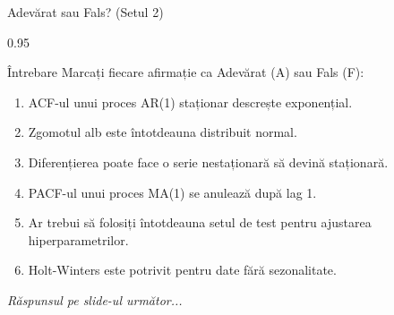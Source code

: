 \documentclass[9pt, aspectratio=169, t]{beamer}
\begin{document}
\begin{frame}{Adevărat sau Fals? (Setul 2)}
    \begin{cminipage}{0.95\textwidth}
    \begin{alertblock}{Întrebare}
        Marcați fiecare afirmație ca Adevărat (A) sau Fals (F):
    \end{alertblock}

    \vspace{0.3cm}

    \begin{enumerate}\setlength{\itemsep}{0pt}
        \item ACF-ul unui proces AR(1) staționar descrește exponențial. \hfill \underline{\hspace{1cm}}

        \vspace{0.2cm}

        \item Zgomotul alb este întotdeauna distribuit normal. \hfill \underline{\hspace{1cm}}

        \vspace{0.2cm}

        \item Diferențierea poate face o serie nestaționară să devină staționară. \hfill \underline{\hspace{1cm}}

        \vspace{0.2cm}

        \item PACF-ul unui proces MA(1) se anulează după lag 1. \hfill \underline{\hspace{1cm}}

        \vspace{0.2cm}

        \item Ar trebui să folosiți întotdeauna setul de test pentru ajustarea hiperparametrilor. \hfill \underline{\hspace{1cm}}

        \vspace{0.2cm}

        \item Holt-Winters este potrivit pentru date fără sezonalitate. \hfill \underline{\hspace{1cm}}
    \end{enumerate}

    \vspace{0.3cm}

    \begin{center}
        \textit{Răspunsul pe slide-ul următor...}
    \end{center}
    \end{cminipage}
\end{frame}
\end{document}
